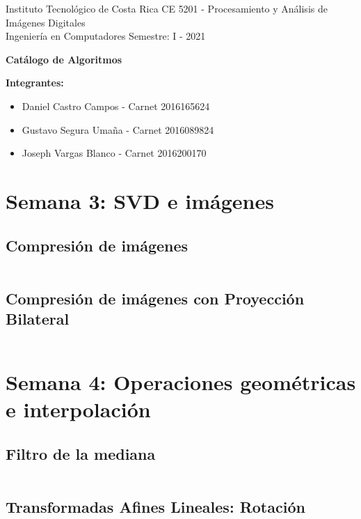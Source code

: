 \documentclass[10pt]{article}
\begin{document}
Instituto Tecnológico de Costa Rica \hfill  CE 5201 - Procesamiento y Análisis de Imágenes Digitales\\
Ingeniería en Computadores \hfill Semestre: I - 2021\\




\begin{center}\textbf{\huge Catálogo de Algoritmos}  \end{center}

{\bf Integrantes: }
\begin{itemize}
\item Daniel Castro Campos - Carnet 2016165624
\item Gustavo Segura Umaña - Carnet 2016089824
\item Joseph Vargas Blanco - Carnet 2016200170
\end{itemize}

\section{Semana 3: SVD e imágenes}
\subsection{Compresión de imágenes}
\inputminted{matlab}{1-compresion/1_1_compresion.m}
\subsection{Compresión de imágenes con Proyección Bilateral}
\inputminted{python}{1-compresion/1_2_compresion_proyeccion_bilateral.py}


\section{Semana 4: Operaciones geométricas e interpolación}


\subsection{Filtro de la mediana}
\inputminted{matlab}{2-transformadas_afines/2_1_mediana.m}

\subsection{Transformadas Afines Lineales: Rotación}
\inputminted{python}{2-transformadas_afines/2_2_1_rotar.py}
\end{document}

